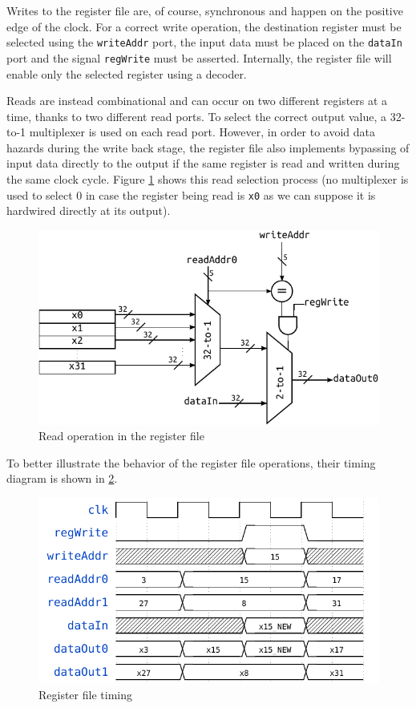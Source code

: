 \documentclass[a4paper]{article}
\begin{document}
Writes to the register file are, of course, synchronous and happen on the positive edge of the clock. For a correct write operation, the destination register must be selected using the \texttt{writeAddr} port, the input data must be placed on the \texttt{dataIn} port and the signal \texttt{regWrite} must be asserted. Internally, the register file will enable only the selected register using a decoder.

Reads are instead combinational and can occur on two different registers at a time, thanks to two different read ports. To select the correct output value, a 32-to-1 multiplexer is used on each read port. However, in order to avoid data hazards during the write back stage, the register file also implements bypassing of input data directly to the output if the same register is read and written during the same clock cycle. Figure \ref{fig:rf_read} shows this read selection process (no multiplexer is used to select 0 in case the register being read is \texttt{x0} as we can suppose it is hardwired directly at its output).

\begin{figure}[hbtp]
    \centering
    \includegraphics{../register_file/ref/schematic/register_file_deep.pdf}
    \caption{Read operation in the register file}
    \label{fig:rf_read}
\end{figure}

To better illustrate the behavior of the register file operations, their timing diagram is shown in \ref{fig:rf_timing}.

\begin{figure}[hbtp]
    \centering
    \includegraphics[scale=.8]{../register_file/ref/timing/rf_timing.pdf}
    \caption{Register file timing}
    \label{fig:rf_timing}
\end{figure}
\end{document}
